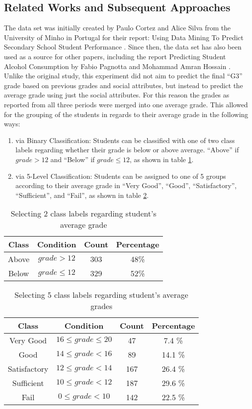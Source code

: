 \subsection{Related Works and Subsequent Approaches}
The data set was initially created by Paulo Cortez and Alice Silva from the University of Minho in Portugal for their report: Using Data Mining To Predict Secondary School Student Performance \cite{cortez2008}. Since then, the data set has also been used as a source for other papers, including the report Predicting Student Alcohol Consumption by Fabio Pagnotta and Mohammad Amran Hossain \cite{alcohol}. 
Unlike the original study, this experiment did not aim to predict the final ``G3'' grade based on previous grades and social attributes, but instead to predict the average grade using just the social attributes. For this reason the grades as reported from all three periods were merged into one average grade. 
This allowed for the grouping of the students in regards to their average grade in the following ways:
\begin{enumerate}
    \item via Binary Classification: Students can be classified with one of two class labels regarding whether their grade is below or above average. ``Above'' if $ grade  >  12$  and ``Below'' if  $ grade \le  12$, as shown in table \ref{table:binaryClassification}.
    \item via 5-Level Classification: Students can be assigned to one of 5 groups according to their average grade in ``Very Good'', ``Good'', ``Satisfactory'', ``Sufficient'', and ``Fail'', as shown in table \ref{table:5levelClassification}.
\end{enumerate}

\begin{table}[h]
\center
\begin{tabular}{cccc}
\hline
    Class & Condition & Count & Percentage \\
    \hline
    Above & $ grade  >   12 $ & 303 & 48\% \\
    Below & $ grade  \le  12 $ & 329 & 52\% \\
    \hline
\end{tabular}
\caption{Selecting 2 class labels regarding student's average grade}
\label{table:binaryClassification}
\end{table}
\begin{table}[h]
\center
\begin{tabular}{cccc}
\hline
    Class & Condition & Count & Percentage \\
    \hline
    Very Good & $ 16 \le grade \le 20 $ & 47 & 7.4 \% \\
    Good & $ 14\le grade < 16 $  & 89 & 14.1 \% \\
    Satisfactory & $ 12\le grade < 14 $ & 167 & 26.4 \% \\
    Sufficient & $ 10\le grade < 12 $ & 187 & 29.6 \% \\
    Fail & $ 0 \le grade < 10 $  & 142 & 22.5 \%\\
    \hline
\end{tabular}
\caption{Selecting 5 class labels regarding student's average grades}
\label{table:5levelClassification}
\end{table}
